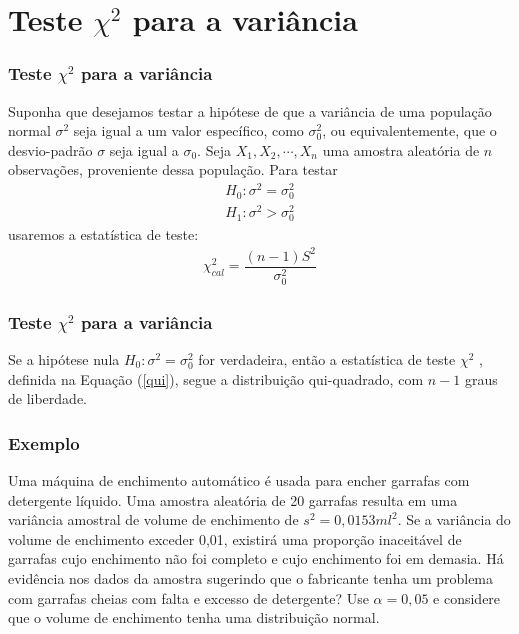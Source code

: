 \documentclass[14pt,aspectratio=1610]{beamer}
\begin{document}
\section{Teste \texorpdfstring{$\chi^{2}$}{$x^{2}$} para a variância}
\begin{frame}{}
\frametitle{Teste $\chi^{2}$ para a variância}
\begin{block}{}
\justifying
Suponha que desejamos testar a hipótese de que a variância de uma população normal $\sigma^{2}$ seja igual a um valor específico, como $\sigma^{2}_{0}$, ou 
equivalentemente, que o desvio-padrão $\sigma$ seja igual a $\sigma_{0}.$ Seja $X_{1},X_{2},\cdots,X_{n}$ uma amostra aleatória de $n$ observações, proveniente 
dessa população. Para testar 
\begin{align*}
H_{0}: \sigma^{2}=\sigma_{0}^{2}\\
H_{1}:\sigma^{2}>\sigma_{0}^{2}
\end{align*}
usaremos a estatística de teste:
\begin{align}\label{qui}
\chi^{2}_{cal}=\dfrac{(n-1)S^{2}}{\sigma_{0}^{2}}
\end{align}
\end{block}
\end{frame}
\begin{frame}{}
\frametitle{Teste $\chi^{2}$ para a variância}
\begin{block}{}
\justifying
Se a hipótese nula $H_{0}: \sigma^{2}=\sigma_{0}^{2}$ for verdadeira, então a estatística de teste $\chi^{2}$ , definida na Equação (\ref{qui}), segue a distribuição qui-quadrado, 
com $n - 1$ graus de liberdade.
\end{block}
\end{frame}

\begin{frame}{}
\frametitle{Exemplo}
\begin{block}{}
\justifying
Uma máquina de enchimento automático é usada para encher garrafas com detergente líquido. Uma amostra aleatória de 20 garrafas resulta em uma variância amostral de volume de enchimento de $ s^{2}= 0,0153 ml^{2}$. Se a variância do volume de enchimento exceder 0,01, existirá uma proporção inaceitável de garrafas cujo enchimento não foi completo e cujo enchimento foi em demasia. Há evidência nos dados da amostra sugerindo que o fabricante tenha um problema com garrafas cheias com falta e excesso de detergente? Use $\alpha = 0,05$ e considere que o volume de enchimento tenha uma distribuição normal.
\end{block}
\end{frame}
\end{document}
